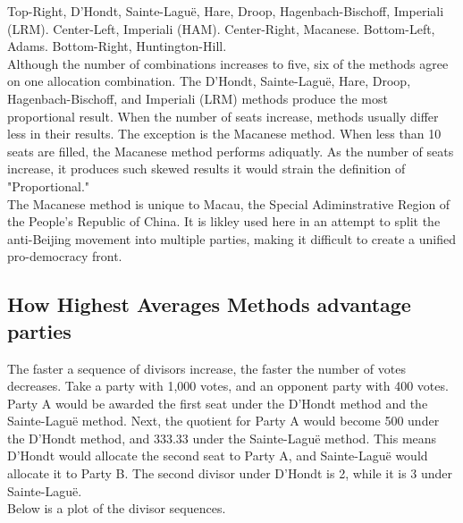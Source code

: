 \documentclass{article}
\begin{document}
    Top-Right, D'Hondt, Sainte-Laguë, Hare, Droop, Hagenbach-Bischoff, Imperiali (LRM).
    Center-Left, Imperiali (HAM).
    Center-Right, Macanese.
    Bottom-Left, Adams.
    Bottom-Right, Huntington-Hill.\\

    Although the number of combinations increases to five, six of the methods agree on one allocation combination. The D'Hondt, Sainte-Laguë, Hare, Droop, Hagenbach-Bischoff, and Imperiali (LRM) methods produce the most proportional result. When the number of seats increase, methods usually differ less in their results. The exception is the Macanese method. When less than 10 seats are filled, the Macanese method performs adiquatly. As the number of seats increase, it produces such skewed results it would strain the definition of "Proportional."\\

    The Macanese method is unique to Macau, the Special Adiminstrative Region of the People's Republic of China. It is likley used here in an attempt to split the anti-Beijing movement into multiple parties, making it difficult to create a unified pro-democracy front.

    \subsection{How Highest Averages Methods advantage parties}

    The faster a sequence of divisors increase, the faster the number of votes decreases. Take a party with 1,000 votes, and an opponent party with 400 votes. Party A would be awarded the first seat under the D'Hondt method and the Sainte-Laguë method. Next, the quotient for Party A would become 500 under the D'Hondt method, and 333.33 under the Sainte-Laguë method. This means D'Hondt would allocate the second seat to Party A, and Sainte-Laguë would allocate it to Party B. The second divisor under D'Hondt is 2, while it is 3 under Sainte-Laguë.\\

    Below is a plot of the divisor sequences.
\end{document}
